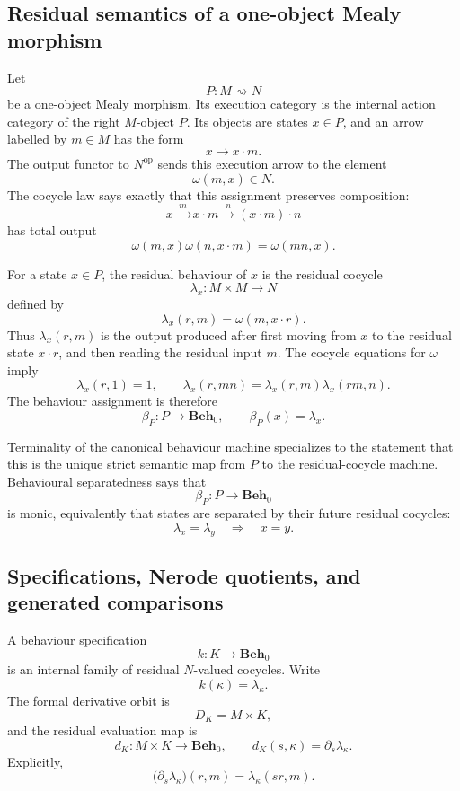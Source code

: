 \subsection{Residual semantics of a one-object Mealy morphism}
\label{subsec:one-object-residual-semantics}

Let
\[
    P:M\rightsquigarrow N
\]
be a one-object Mealy morphism. Its execution category is the internal action
category of the right \(M\)-object \(P\). Its objects are states \(x\in P\),
and an arrow labelled by \(m\in M\) has the form
\[
    x\longrightarrow x\cdot m.
\]
The output functor to \(N^{\mathrm{op}}\) sends this execution arrow to the
element
\[
    \omega(m,x)\in N.
\]
The cocycle law says exactly that this assignment preserves composition:
\[
    x
        \xrightarrow{\;m\;}
    x\cdot m
        \xrightarrow{\;n\;}
    (x\cdot m)\cdot n
\]
has total output
\[
    \omega(m,x)\omega(n,x\cdot m)=\omega(mn,x).
\]

For a state \(x\in P\), the residual behaviour of \(x\) is the residual cocycle
\[
    \lambda_x:M\times M\to N
\]
defined by
\[
    \lambda_x(r,m)=\omega(m,x\cdot r).
\]
Thus \(\lambda_x(r,m)\) is the output produced after first moving from \(x\)
to the residual state \(x\cdot r\), and then reading the residual input \(m\).
The cocycle equations for \(\omega\) imply
\[
    \lambda_x(r,1)=1,
    \qquad
    \lambda_x(r,mn)=\lambda_x(r,m)\lambda_x(rm,n).
\]
The behaviour assignment is therefore
\[
    \beta_P:P\to\mathbf{Beh}_0,
    \qquad
    \beta_P(x)=\lambda_x.
\]

Terminality of the canonical behaviour machine specializes to the statement
that this is the unique strict semantic map from \(P\) to the residual-cocycle
machine. Behavioural separatedness says that
\[
    \beta_P:P\to\mathbf{Beh}_0
\]
is monic, equivalently that states are separated by their future residual
cocycles:
\[
    \lambda_x=\lambda_y
    \quad\Longrightarrow\quad
    x=y.
\]

\subsection{Specifications, Nerode quotients, and generated comparisons}
\label{subsec:one-object-nerode-specialization}

A behaviour specification
\[
    k:K\to\mathbf{Beh}_0
\]
is an internal family of residual \(N\)-valued cocycles. Write
\[
    k(\kappa)=\lambda_\kappa.
\]
The formal derivative orbit is
\[
    D_K=M\times K,
\]
and the residual evaluation map is
\[
    d_K:M\times K\to\mathbf{Beh}_0,
    \qquad
    d_K(s,\kappa)=\partial_s\lambda_\kappa.
\]
Explicitly,
\[
    \bigl(\partial_s\lambda_\kappa\bigr)(r,m)
    =
    \lambda_\kappa(sr,m).
\]

